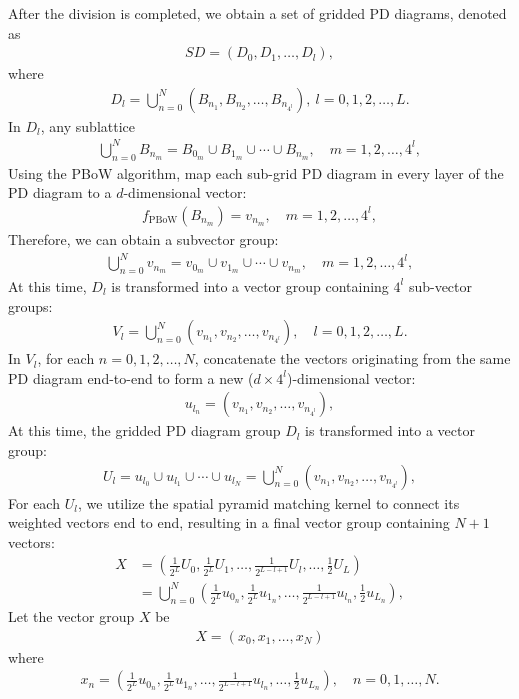 \documentclass[5GeSdc,ASOC,numref,printGA,printHL,CASflow,nocrossmark,longtitle,PROOF]{/usr/local/texlive/iTemplates/01-Templates/01-Els-Jnl/01-Standard_Templates/V1/ELS_MDL5-V1-6}
\begin{document}
\begin{articlestyle}
After the division is completed, we obtain a set of gridded PD diagrams, denoted as  
\begin{align*}  
SD = (D_0, D_1, \ldots, D_l),  
\end{align*}where \begin{align*} D_l = \bigcup_{n=0}^{N} (B_{n_1}, B_{n_2}, \ldots, B_{n_{4^l}}), \ l = 0, 1, 2, \ldots, L.  
\end{align*}  
In $ D_l $, any sublattice   
\begin{align*}  
\bigcup_{n=0}^{N} B_{n_m} = B_{0_m} \cup B_{1_m} \cup \cdots \cup B_{n_m}, \quad m = 1, 2, \ldots, 4^l,  
\end{align*}  Using the PBoW algorithm, map each sub-grid PD diagram in every layer of the PD diagram to a $ d $-dimensional vector:  
\begin{align*}  
f_{\text{PBoW}}(B_{n_m}) = v_{n_m}, \quad m = 1, 2, \ldots, 4^l,  
\end{align*}  Therefore, we can obtain a subvector group:  
\begin{align*}  
\bigcup_{n=0}^{N} v_{n_m} = v_{0_m} \cup v_{1_m} \cup \cdots \cup v_{n_m}, \quad m = 1, 2, \ldots, 4^l,  
\end{align*}  At this time, $ D_l $ is transformed into a vector group containing $ 4^l $ \hbox{sub-vector} groups:  
\begin{align*}  
V_{l} = \bigcup_{n=0}^{N} (v_{n_1}, v_{n_2}, \ldots,v_{n_{4^l}}), \quad l = 0, 1, 2, \ldots, L.  
\end{align*}  {In $ V_l $, for each $ n = 0, 1, 2, \ldots, N $, concatenate the vectors originating from the same PD diagram end-to-end to form a new ($ d \times 4^l $)-dimensional vector:}
\begin{align*}  
u_{l_n} = (v_{n_1}, v_{n_2}, \ldots, v_{n_{4^l}}),  
\end{align*}  At this time, the {gridded} PD diagram group $ D_l $ is transformed into a vector group:  
\begin{align*}  
U_l = u_{l_0} \cup u_{l_1} \cup \cdots \cup u_{l_N} = \bigcup_{n=0}^{N} (v_{n_1}, v_{n_2}, \ldots, v_{n_{4^l}}),  
\end{align*}  For each $ U_l $, we utilize the spatial pyramid matching kernel to connect its weighted vectors end to end, resulting in a final vector group containing $ N + 1 $ vectors:  
\begin{align*}  
X &= \left(\frac{1}{2^L} U_0,\frac{1}{2^L} U_1, \ldots, \frac{1}{2^{L-l+1}} U_l, \ldots,\frac{1}{2} U_L\right) \\
&= \bigcup_{n=0}^{N}\left(\frac{1}{2^L} u_{0_n},\frac{1}{2^L} u_{1_n}, \ldots, \frac{1}{2^{L-l+1}} u_{l_n}, \frac{1}{2} u_{L_n}\right),
\end{align*}  Let the vector group $ X $ be  
\begin{align*}  
X = (x_0, x_1, \ldots, x_N)  
\end{align*}where  
\begin{align*}  
x_n = \left(\frac{1}{2^L} u_{0_n}, \frac{1}{2^L} u_{1_n},\ldots,\frac{1}{2^{L-l+1}} u_{l_n}, \ldots, \frac{1}{2} u_{L_n}\right), \quad n = 0, 1, \ldots, N.  
\end{align*}  


\end{articlestyle}
\end{document}
